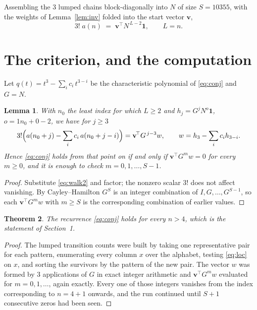 \documentclass[11pt,a4paper]{article}
\theoremstyle{plain}
\newtheorem{theorem}{Theorem}
\newtheorem{lemma}[theorem]{Lemma}
\theoremstyle{definition}
\begin{document}
Assembling the $3$ lumped chains block-diagonally into $N$ of size $S=10355$, with the
weights of Lemma~\ref{lem:inv} folded into the start vector $\mathbf{v}$,
\begin{equation}\label{eq:walk2}
3!\;a(n)\;=\;\mathbf{v}^{\!\top}N^{\,L-2}\mathbf{1},\qquad L=n .
\end{equation}

\section{The criterion, and the computation}

Let $q(t)=t^{3}-\sum_i c_i\,t^{3-i}$ be the characteristic polynomial of
\eqref{eq:conj} and $G=N$.

\begin{lemma}\label{lem:crit}
With $n_0$ the least index for which $L\ge2$ and $h_j=G^{j}N^{o}\mathbf{1}$,
$o=1n_0+0-2$, we have for $j\ge3$
\[
3!\Bigl(a(n_0+j)-\sum_i c_i\,a(n_0+j-i)\Bigr)
=\mathbf{v}^{\!\top}G^{\,j-3}w,\qquad
w=h_{3}-\sum_i c_i h_{3-i} .
\]
Hence \eqref{eq:conj} holds from that point on if and only if
$\mathbf{v}^{\!\top}G^{m}w=0$ for every $m\ge0$, and it is enough to check
$m=0,1,\dots,S-1$.
\end{lemma}

\begin{proof}
Substitute \eqref{eq:walk2} and factor; the nonzero scalar $3!$ does not affect
vanishing. By Cayley--Hamilton $G^{S}$ is an integer combination of $I,G,\dots,G^{S-1}$,
so each $\mathbf{v}^{\!\top}G^{m}w$ with $m\ge S$ is the corresponding combination of
earlier values.
\end{proof}

\begin{theorem}
The recurrence \eqref{eq:conj} holds for every $n>4$, which is the statement of
Section~1.
\end{theorem}

\begin{proof}
The lumped transition counts were built by taking one representative pair for each pattern,
enumerating every column $x$ over the alphabet, testing \eqref{eq:loc} on $x$, and sorting
the survivors by the pattern of the new pair. The vector $w$ was formed by $3$
applications of $G$ in exact integer arithmetic and $\mathbf{v}^{\!\top}G^{m}w$
evaluated for $m=0,1,\dots$, again exactly. Every one of those integers vanishes from the
index corresponding to $n=4+1$ onwards, and the run continued until $S+1$ consecutive
zeros had been seen.
\end{proof}
\end{document}
